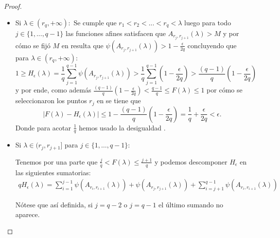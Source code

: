 \begin{proof}
\begin{itemize}
        \item Si $\lambda \in (r_q, +\infty):$
        Se cumple que $r_1 < r_2 <...< r_q <\lambda$ luego  
        para todo $j \in \{1, ..., q-1\}$ las funciones afines satisfacen que  
        $A_{r_j, r_{j+1}}(\lambda) > M$ y por cómo se fijó $M$ en 
        resulta que  $\psi( A_{r_j, r_{j+1}}(\lambda)) > 1-\frac{\epsilon}{2q}$ concluyendo que 
        para $\lambda \in (r_q,+\infty):$
        \begin{equation}
            1 \geq
            H_\epsilon(\lambda) = \frac{1}{q} \sum^{q-1}_{j=1} \psi( A_{r_j, r_{j+1}}(\lambda)) 
            >
                \frac{1}{q} \sum^{q-1}_{j=1}  \left(1-\frac{\epsilon}{2q} \right)
            >
            \frac{(q-1)}{q}  \left(1-\frac{\epsilon}{2q} \right)   
        \end{equation}
        y por ende, como además $\frac{(q-1)}{q}  \left(1-\frac{\epsilon}{2q} \right) <  \frac{q-1}{q} \leq F(\lambda) \leq 1$ por cómo se seleccionaron los puntos $r_j$ en 
         se tiene que 
        \begin{equation}
            | F(\lambda) - H_{\epsilon}(\lambda) | 
            \leq
            1 - \frac{(q-1)}{q}  \left(1-\frac{\epsilon}{2q} \right)
            = \frac{1}{q} + \frac{\epsilon}{2q}
            < \epsilon.
        \end{equation}
        Donde para acotar $\frac{1}{q}$ hemos usado la desigualdad .

        \item Si $\lambda \in (r_{j},r_{j+1}]$ para $j \in \{ 1, \ldots, q-1\}$: 
        
        Tenemos por una parte que $\frac{j}{q} < F(\lambda) \leq \frac{j+1}{q}$ y 
        podemos descomponer $H_\epsilon$ en las siguientes sumatorias: 
        \begin{equation}
            \begin{split}
                q H_\epsilon(\lambda) 
                = 
                 \sum^{j-1}_{i=1} \psi( A_{r_i, r_{i+1}}(\lambda))
                + 
                \psi( A_{r_j, r_{j+1}}(\lambda))
                + 
                \sum^{q-1}_{i=j+1} \psi( A_{r_i, r_{i+1}}(\lambda))
            \end{split}
        \end{equation}

        Nótese que así definida, si $j = q-2$ o $j = q -1$ el último sumando no aparece. 


\end{itemize}
\end{proof}
